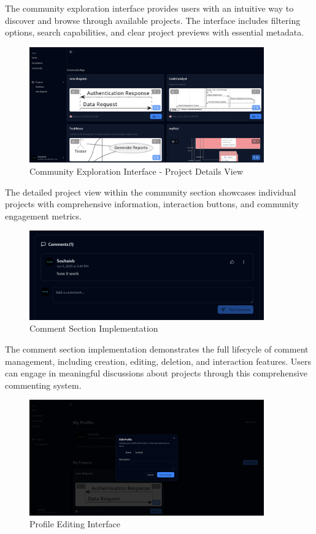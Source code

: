The community exploration interface provides users with an intuitive way to discover and browse through available projects. The interface includes filtering options, search capabilities, and clear project previews with essential metadata.

\begin{figure}[H]
\centering
\includegraphics[width=0.9\textwidth]{screenshots/community2.png}
\caption{Community Exploration Interface - Project Details View}
\label{fig:community_details}
\end{figure}

The detailed project view within the community section showcases individual projects with comprehensive information, interaction buttons, and community engagement metrics.

\begin{figure}[H]
\centering
\includegraphics[width=0.9\textwidth]{screenshots/comment-section.png}
\caption{Comment Section Implementation}
\label{fig:comment_section}
\end{figure}

The comment section implementation demonstrates the full lifecycle of comment management, including creation, editing, deletion, and interaction features. Users can engage in meaningful discussions about projects through this comprehensive commenting system.

\begin{figure}[H]
\centering
\includegraphics[width=0.9\textwidth]{screenshots/edit-profile.png}
\caption{Profile Editing Interface}
\label{fig:edit_profile}
\end{figure}

